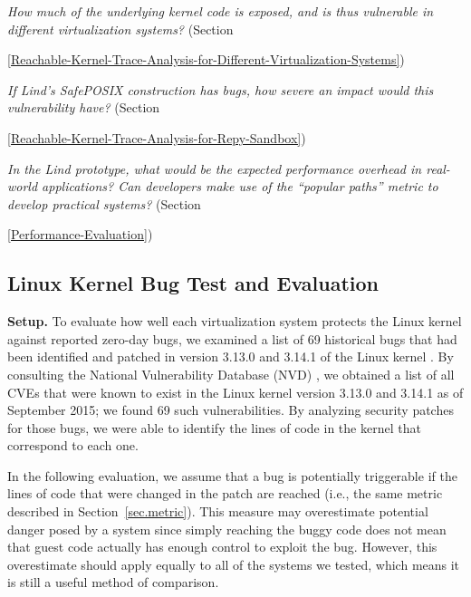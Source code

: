 \textit{How much of the underlying kernel code is exposed, and is thus
vulnerable in different virtualization systems?}
(Section~{{\ref{Reachable-Kernel-Trace-Analysis-for-Different-Virtualization-Systems}})

\textit{If Lind's SafePOSIX construction has bugs, how severe an impact would
this vulnerability have?}
(Section~{{\ref{Reachable-Kernel-Trace-Analysis-for-Repy-Sandbox}})

\textit{In the Lind prototype, what would be the expected performance overhead in
real-world applications? Can developers make use of the ``popular paths'' metric to develop 
practical systems?}
(Section~{{\ref{Performance-Evaluation}})

\subsection{Linux Kernel Bug Test and Evaluation}
\label{Linux-Kernel-Bug-Test-and-Evaluation}


\noindent
\textbf{Setup.}
To evaluate how well each virtualization system protects the Linux kernel
against reported zero-day bugs,
we examined a list of 69 historical bugs that had been identified and patched in version 3.13.0 and 3.14.1 of the Linux kernel \cite{CVE-Datasource}. 
By consulting the National Vulnerability Database (NVD) \cite{NVD}, we obtained a list of all CVEs \cite{CVE} 
that were known to exist in the Linux kernel version 3.13.0 and 3.14.1 as of September 2015; we found 69 such vulnerabilities. 
By analyzing security patches for those bugs,
we were able to identify the lines of code in the kernel that correspond to each one.

In the following evaluation, we assume that a bug is potentially triggerable if the lines of code that were changed in the patch are reached
(i.e., the same metric described in Section~\ref{sec.metric}).
This measure may overestimate potential danger posed by a system since simply reaching the buggy code does not mean that guest code
actually has enough control to exploit the bug.
However, this overestimate should apply equally to all of the systems we tested, which means it is still a useful method of comparison.

}}}
